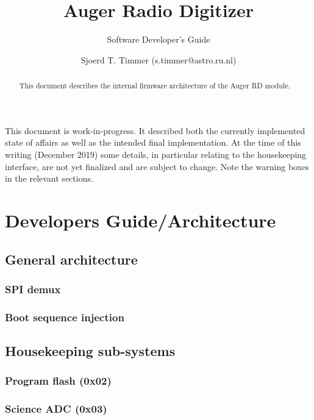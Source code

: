 \documentclass[a4paper,indent]{paper}
\title{Auger Radio Digitizer}
\subtitle{Software Developer's Guide}
\author{%
  Sjoerd T. Timmer (s.timmer@astro.ru.nl)}
\date{}
\begin{document}
\maketitle{}
\begin{abstract}
  This document describes the internal firmware architecture of the Auger \acf{RD} module. \acresetall
\end{abstract}

\begin{mdframed}[linewidth=2pt,linecolor=orange,backgroundcolor=orange!10]%
  This document is work-in-progress.
  It described both the currently implemented state of affairs as well as the intended final implementation.
  At the time of this writing (December 2019) some details, in particular relating to the housekeeping interface, are not yet finalized and are subject to change. Note the warning boxes in the relevant sections. 
\end{mdframed}
  
\tableofcontents

\clearpage


\section{Developers Guide/Architecture}
\subsection{General architecture}


\subsubsection{\acs{SPI} demux}

\subsubsection{Boot sequence injection}


\subsection{Housekeeping sub-systems}

\subsubsection{Program flash (0x02)}

\subsubsection{Science \acs{ADC} (0x03)}
\end{document}

